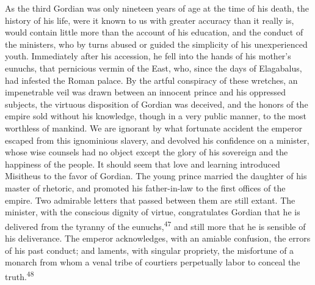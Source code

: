 As the third Gordian was only nineteen years of age at the time
of his death, the history of his life, were it known to us with
greater accuracy than it really is, would contain little more
than the account of his education, and the conduct of the
ministers, who by turns abused or guided the simplicity of his
unexperienced youth. Immediately after his accession, he fell
into the hands of his mother’s eunuchs, that pernicious vermin of
the East, who, since the days of Elagabalus, had infested the
Roman palace. By the artful conspiracy of these wretches, an
impenetrable veil was drawn between an innocent prince and his
oppressed subjects, the virtuous disposition of Gordian was
deceived, and the honors of the empire sold without his
knowledge, though in a very public manner, to the most worthless
of mankind. We are ignorant by what fortunate accident the
emperor escaped from this ignominious slavery, and devolved his
confidence on a minister, whose wise counsels had no object
except the glory of his sovereign and the happiness of the
people. It should seem that love and learning introduced
Misitheus to the favor of Gordian. The young prince married the
daughter of his master of rhetoric, and promoted his
father-in-law to the first offices of the empire. Two admirable
letters that passed between them are still extant. The minister,
with the conscious dignity of virtue, congratulates Gordian that
he is delivered from the tyranny of the eunuchs,\textsuperscript{47} and still
more that he is sensible of his deliverance. The emperor
acknowledges, with an amiable confusion, the errors of his past
conduct; and laments, with singular propriety, the misfortune of
a monarch from whom a venal tribe of courtiers perpetually labor
to conceal the truth.\textsuperscript{48}



